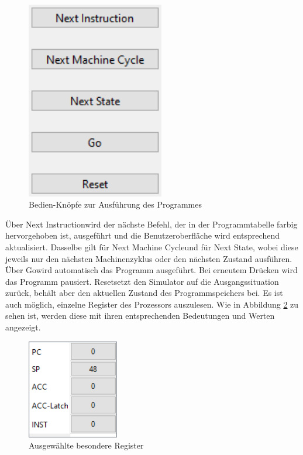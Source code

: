 \documentclass[12pt]{article}
\newcommand{\imgSpaceBefore}{\vspace{10pt}}
\begin{document}
\begin{figure}[H]
\centering
\includegraphics[width=6cm]{bilder/Bedienen}
\caption{Bedien-Knöpfe zur Ausführung des Programmes}
\label{fig:Bedienen}
\end{figure}

\noindent
Über \glqq Next Instruction\grqq wird der nächste Befehl, der in der Programmtabelle farbig hervorgehoben ist, ausgeführt und die Benutzeroberfläche wird entsprechend aktualisiert. Dasselbe gilt für \glqq Next Machine Cycle\grqq und für \glqq Next State\grqq, wobei diese jeweils nur den nächsten Machinenzyklus oder den nächsten Zustand ausführen. Über \glqq Go\grqq wird automatisch das Programm ausgeführt. Bei erneutem Drücken wird das Programm pausiert. \glqq Reset\grqq setzt den Simulator auf die Ausgangssituation zurück, behält aber den aktuellen Zustand des Programmspeichers bei. Es ist auch möglich, einzelne Register des Prozessors auszulesen. Wie in Abbildung \ref{fig:Register} zu sehen ist, werden diese mit ihren entsprechenden Bedeutungen und Werten angezeigt.\imgSpaceBefore

\begin{figure}[h]
\centering
\includegraphics[width=4cm]{bilder/Register}
\caption{Ausgewählte besondere Register}
\label{fig:Register}
\end{figure}
\end{document}
